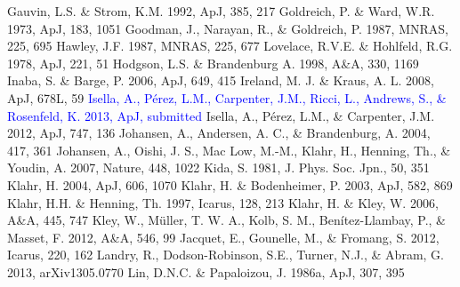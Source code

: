 \documentclass[apj]{emulateapj}
\def\blue#1{\textcolor{blue}{#1}}
\begin{document}
\begin{thebibliography}{}
 Gauvin, L.S. \& Strom, K.M. 1992, ApJ, 385, 217
 Goldreich, P. \& Ward, W.R. 1973, ApJ, 183, 1051
 Goodman, J., Narayan, R., \& Goldreich, P. 1987, MNRAS, 225, 695
 Hawley, J.F. 1987, MNRAS, 225, 677
  Lovelace, R.V.E. \& Hohlfeld, R.G. 1978, ApJ, 221, 51
 Hodgson, L.S. \& Brandenburg A. 1998, A\&A, 330, 1169
 Inaba, S. \& Barge, P. 2006, ApJ, 649, 415
 Ireland, M. J. \& Kraus, A. L. 2008, ApJ, 678L, 59
\bibitem[{{\blue{Isella et al.}}(2013)}]{Isella13} \blue{Isella, A., P\'erez, L.M., Carpenter, J.M., Ricci, L., Andrews, S., \& Rosenfeld, K. 2013, ApJ, submitted}
 Isella, A., P\'erez, L.M., \& Carpenter, J.M. 2012, ApJ, 747, 136
 Johansen, A., Andersen, A. C., \& Brandenburg, A. 2004, 417, 361
 Johansen, A., Oishi, J. S., Mac Low, M.-M., Klahr, H., Henning, Th., \& Youdin, A. 2007, Nature, 448, 1022
 Kida, S. 1981, J. Phys. Soc. Jpn.,  50, 351
 Klahr, H. 2004, ApJ, 606, 1070
 Klahr, H. \& Bodenheimer, P. 2003, ApJ, 582, 869
 Klahr, H.H. \& Henning, Th. 1997, Icarus, 128, 213
 Klahr, H. \& Kley, W. 2006, A\&A, 445, 747
 Kley, W., M\"uller, T. W. A., Kolb, S. M., Ben\'itez-Llambay, P., \& Masset, F. 2012, A\&A, 546, 99
 Jacquet, E., Gounelle, M., \& Fromang, S. 2012, Icarus, 220, 162
 Landry, R., Dodson-Robinson, S.E., Turner, N.J., \& Abram, G. 2013, arXiv1305.0770
 Lin, D.N.C. \& Papaloizou, J. 1986a, ApJ, 307, 395

\end{thebibliography}
\end{document}
